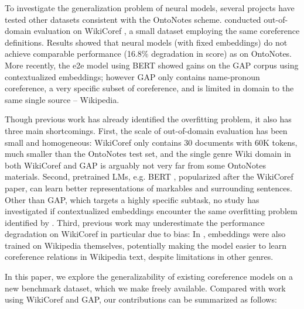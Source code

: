 \documentclass[11pt,a4paper]{article}
\begin{document}
To investigate the generalization problem of neural models, several projects have tested other datasets consistent with the OntoNotes scheme. \citet{moosavi-strube-2018-using} conducted out-of-domain evaluation on WikiCoref \cite{ghaddar-langlais-2016-wikicoref}, a small dataset employing the same coreference definitions. Results showed that neural models (with fixed embeddings) do not achieve comparable performance (16.8\% degradation in score) as on OntoNotes.
More recently, the e2e model using BERT \cite{Joshi2019BERTFC} showed gains on the GAP corpus \cite{webster2018gap} using contextualized embeddings; however GAP only contains name-pronoun coreference, a very specific subset of coreference, and is limited in domain to the same single source -- Wikipedia. 


Though previous work has already identified the overfitting problem, it also has three main shortcomings. First, the scale of out-of-domain evaluation has been small and homogeneous: WikiCoref only contains 30 documents with 60K tokens,  much smaller than the OntoNotes test set, and the single genre Wiki domain in both WikiCoref and GAP is arguably not very far from some OntoNotes materials. 
Second, pretrained LMs, e.g. BERT \cite{devlin2018bert}, popularized after the WikiCoref paper, can learn better representations of markables and surrounding sentences. Other than GAP, which targets a highly specific subtask, no study has investigated if contextualized embeddings encounter the same overfitting problem identified by \citeauthor{moosavi-strube-2017-lexical}. Third, previous work may underestimate the performance degradation on WikiCoref in particular due to bias: In \citet{moosavi-strube-2018-using}, embeddings were also trained on Wikipedia themselves, potentially making the model easier to learn coreference relations in Wikipedia text, despite limitations in other genres.




In this paper, we explore the generalizability of existing coreference models on a new benchmark dataset, which we make freely available. Compared with work using WikiCoref and GAP, our contributions can be summarized as follows:
\end{document}

